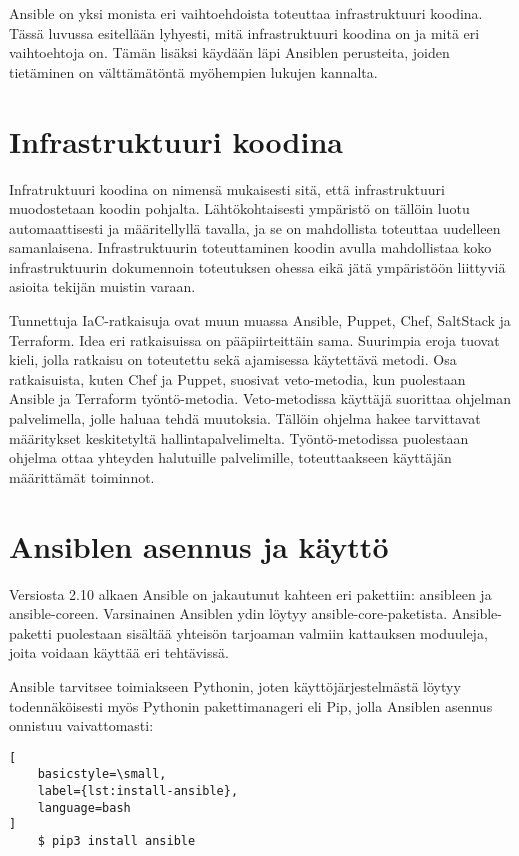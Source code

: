 Ansible on yksi monista eri vaihtoehdoista toteuttaa infrastruktuuri koodina.
Tässä luvussa esitellään lyhyesti, mitä infrastruktuuri koodina on ja
mitä eri vaihtoehtoja on. Tämän lisäksi käydään läpi Ansiblen perusteita,
joiden tietäminen on välttämätöntä myöhempien lukujen kannalta.

\section{Infrastruktuuri koodina}

Infratruktuuri koodina on nimensä mukaisesti sitä, että infrastruktuuri
muodostetaan koodin pohjalta. Lähtökohtaisesti ympäristö on tällöin
luotu automaattisesti ja määritellyllä tavalla, ja se on mahdollista
toteuttaa uudelleen samanlaisena. Infrastruktuurin toteuttaminen koodin
avulla mahdollistaa koko infrastruktuurin dokumennoin toteutuksen ohessa
eikä jätä ympäristöön liittyviä asioita tekijän muistin varaan.
\parencite{KiefMorris2020IaC2}

Tunnettuja IaC-ratkaisuja ovat muun muassa Ansible, Puppet, Chef, SaltStack
ja Terraform. Idea eri ratkaisuissa on pääpiirteittäin sama. Suurimpia eroja
tuovat kieli, jolla ratkaisu on toteutettu sekä ajamisessa käytettävä
metodi. Osa ratkaisuista, kuten Chef ja Puppet, suosivat veto-metodia,
kun puolestaan Ansible ja Terraform työntö-metodia. Veto-metodissa
käyttäjä suorittaa ohjelman palvelimella, jolle haluaa tehdä muutoksia.
Tällöin ohjelma hakee tarvittavat määritykset keskitetyltä hallintapalvelimelta.
Työntö-metodissa puolestaan ohjelma ottaa yhteyden halutuille palvelimille,
toteuttaakseen käyttäjän määrittämät toiminnot. \parencite{RitiPierluigi2021IaC}

\section{Ansiblen asennus ja käyttö}

Versiosta 2.10 alkaen Ansible on jakautunut kahteen eri pakettiin:
ansibleen ja ansible-coreen. Varsinainen Ansiblen ydin löytyy
ansible-core-paketista. Ansible-paketti puolestaan sisältää yhteisön
tarjoaman valmiin kattauksen moduuleja, joita voidaan käyttää eri
tehtävissä. \parencite{AnsibleDocs}

Ansible tarvitsee toimiakseen Pythonin, joten käyttöjärjestelmästä
löytyy todennäköisesti myös Pythonin pakettimanageri eli Pip, jolla
Ansiblen asennus onnistuu vaivattomasti:

\begin{lstlisting}[
    basicstyle=\small,
    label={lst:install-ansible},
    language=bash
]
    $ pip3 install ansible
\end{lstlisting}

